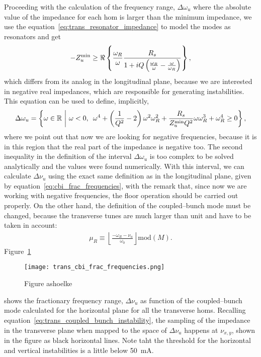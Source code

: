     Proceeding with the calculation of the frequency range, $\Delta\omega_u$ where the absolute value of the impedance for each \gls{hom} is larger than the minimum impedance, we use the equation~\eqref{eq:trans_resonator_impedance} to model the modes as resonators and get
    \begin{align}
        -Z_u^\text{min} \ge \Re\left\{\frac{\omega_R}{\omega}\frac{R_s}{1 + iQ\left(\frac{\omega_R}{\omega}-\frac{\omega}{\omega_R}\right)}\right\},
    \end{align}
    which differs from its analog in the longitudinal plane, because we are interested in negative real impedances, which are responsible for generating instabilities. This equation can be used to define, implicitly,
    \begin{align}
        \Delta\omega_u = \left\{\omega \in \mathbb{R\,\,} \middle|\,\,
        \omega < 0,\,\,\, \omega^4 + \left(\frac{1}{Q^2}-2\right)\omega^2\omega_R^2 + \frac{R_s}{Z_u^\text{min}Q^2}\omega\omega_R^3 + \omega_R^4 \ge 0 \right\},
    \end{align}
    where we point out that now we are looking for negative frequencies, because it is in this region that the real part of the impedance is negative too. The second inequality in the definition of the interval $\Delta\omega_u$ is too complex to be solved analytically and the values were found numerically. With this interval, we can calculate $\Delta\nu_u$ using the exact same definition as in the longitudinal plane, given by equation~\eqref{eq:cbi_frac_frequencies}, with the remark that, since now we are working with negative frequencies, the floor operation should be carried out properly. On the other hand, the definition of the coupled--bunch mode must be changed, because the transverse tunes are much larger than unit and have to be taken in account:
    \begin{align}
        \mu_R \equiv \left\lfloor\frac{-\omega_R-\nu_u}{\omega_0}\right\rfloor \text{mod}(M).
    \end{align}
    Figure~\ref{fig:trans_cbi_frac_frequencies}
    \begin{figure}
        \centering
        \texttt{[image: trans\_cbi\_frac\_frequencies.png]}
        \caption{Figure ashoelke}
        \label{fig:trans_cbi_frac_frequencies}
    \end{figure}
    shows the fractionary frequency range, $\Delta\nu_u$ as function of the coupled--bunch mode calculated for the horizontal plane for all the transverse \glspl{hom}. Recalling equation~\eqref{eq:trans_coupled_bunch_instability}, the sampling of the impedance in the transverse plane when mapped to the space of $\Delta\nu_u$ happens at $\nu_{x,y}$, shown in the figure as black horizontal lines. Note taht the threshold for the horizontal and vertical instabilities is a little below \SI{50}{\milli\ampere}.
